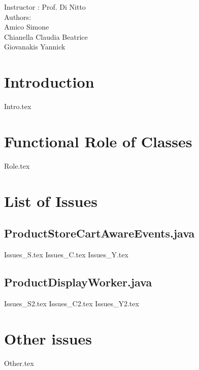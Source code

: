 \documentclass[12pt]{article}
\begin{document}
	\begin{center}
	 	{\Large Instructor : Prof. Di Nitto}
	 	 \vspace{5mm}\\	 
	 	{\Large Authors:}\\
	 	{\Large Amico Simone}\\
	 	{\Large Chianella Claudia Beatrice}\\
	 	{\Large Giovanakis Yannick}
	\end{center}
	 
	\newpage
	
	
	\tableofcontents{}
	 
	\newpage
		
	
	\section{Introduction}
	{Intro.tex}
	\newpage

	\section{Functional Role of Classes}
	{Role.tex}
	\newpage

	\section{List of Issues}
	\subsection{ProductStoreCartAwareEvents.java}
	{Issues_S.tex}
	{Issues_C.tex}
	{Issues_Y.tex}
	\newpage
	\subsection{ProductDisplayWorker.java}
	{Issues_S2.tex}
	{Issues_C2.tex}
	{Issues_Y2.tex}
	\newpage
	
	\section{Other issues}
	{Other.tex}
	\newpage
	
\end{document}

